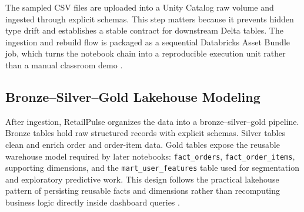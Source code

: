 \documentclass[journal]{IEEEtran}
\begin{document}
The sampled CSV files are uploaded into a Unity Catalog raw volume and ingested through explicit schemas. This step matters because it prevents hidden type drift and establishes a stable contract for downstream Delta tables. The ingestion and rebuild flow is packaged as a sequential Databricks Asset Bundle job, which turns the notebook chain into a reproducible execution unit rather than a manual classroom demo \cite{databricks_bundles}.

\subsection{Bronze--Silver--Gold Lakehouse Modeling}
After ingestion, RetailPulse organizes the data into a bronze--silver--gold pipeline. Bronze tables hold raw structured records with explicit schemas. Silver tables clean and enrich order and order-item data. Gold tables expose the reusable warehouse model required by later notebooks: \texttt{fact\_orders}, \texttt{fact\_order\_items}, supporting dimensions, and the \texttt{mart\_user\_features} table used for segmentation and exploratory predictive work. This design follows the practical lakehouse pattern of persisting reusable facts and dimensions rather than recomputing business logic directly inside dashboard queries \cite{armbrust2020deltalake,zaharia2021lakehouse}.
\end{document}
